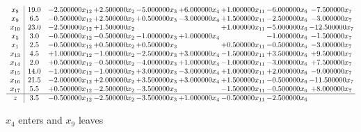 \documentclass[10pt]{article}
\begin{document}
 \[\begin{array}{c| c c@{\hskip 2pt} c@{\hskip 2pt} c@{\hskip 2pt} c@{\hskip 2pt} c@{\hskip 2pt} c@{\hskip 2pt} c@{\hskip 2pt} }
 x_{8}   &  19.0 & -2.500000 x_{12} & + 2.500000 x_{2} & -5.000000 x_{3} & + 6.000000 x_{4} & + 1.000000 x_{11} & -6.000000 x_{6} & -7.500000 x_{7}\\
 x_{9}   &  6.5 & -0.500000 x_{12} & + 2.500000 x_{2} & + 0.500000 x_{3} & -3.000000 x_{4} & + 1.500000 x_{11} & -2.500000 x_{6} & -3.000000 x_{7}\\
 x_{10}   &  23.0 & -2.500000 x_{12} & + 1.500000 x_{2} &    &   & + 1.000000 x_{11} & -5.000000 x_{6} & -12.500000 x_{7}\\
 x_{5}   &  3.0 & -0.500000 x_{12} & -0.500000 x_{2} & -1.000000 x_{3} & + 1.000000 x_{4} &   & -1.000000 x_{6} & -1.500000 x_{7}\\
 x_{1}   &  2.5 & -0.500000 x_{12} & + 0.500000 x_{2} & + 0.500000 x_{3} &   & + 0.500000 x_{11} & -0.500000 x_{6} & -3.000000 x_{7}\\
 x_{13}   &  4.5 & + 1.000000 x_{12} & -1.000000 x_{2} & -2.500000 x_{3} & + 3.000000 x_{4} & -1.500000 x_{11} & + 3.500000 x_{6} & + 9.500000 x_{7}\\
 x_{14}   &  2.0 & + 0.500000 x_{12} & -0.500000 x_{2} & -4.000000 x_{3} & + 1.000000 x_{4} & -1.000000 x_{11} & -3.000000 x_{6} & + 7.500000 x_{7}\\
 x_{15}   &  14.0 & -1.000000 x_{12} & -1.000000 x_{2} & + 3.000000 x_{3} & -3.000000 x_{4} & + 1.000000 x_{11} & + 2.000000 x_{6} & -9.000000 x_{7}\\
 x_{16}   &  21.5 & -2.000000 x_{12} & + 2.000000 x_{2} & + 3.500000 x_{3} & + 3.000000 x_{4} & + 1.500000 x_{11} & -0.500000 x_{6} & -11.500000 x_{7}\\
 x_{17}   &  5.5 & + 0.500000 x_{12} & -2.500000 x_{2} & -3.500000 x_{3} &   & -1.500000 x_{11} & -0.500000 x_{6} & + 8.000000 x_{7}\\
\hline
z    &  3.5 & -0.500000 x_{12} & -2.500000 x_{2} & -3.500000 x_{3} & + 1.000000 x_{4} & -0.500000 x_{11} & -2.500000 x_{6} &   \\
\end{array}\]


 $ x_{4} $ enters and $ x_{9} $ leaves 
\end{document}
